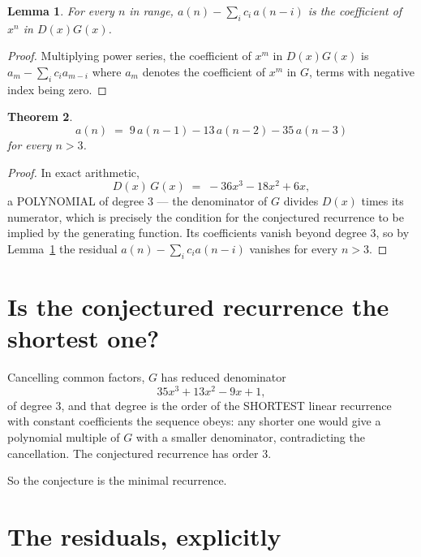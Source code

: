 \documentclass[11pt,a4paper]{article}
\theoremstyle{plain}
\newtheorem{theorem}{Theorem}
\newtheorem{lemma}[theorem]{Lemma}
\theoremstyle{definition}
\begin{document}
\begin{lemma}\label{lem:key}
For every $n$ in range, $a(n)-\sum_i c_i\,a(n-i)$ is the coefficient of $x^{n}$ in
$D(x)G(x)$.
\end{lemma}

\begin{proof}
Multiplying power series, the coefficient of $x^{m}$ in $D(x)G(x)$ is
$a_m-\sum_i c_i a_{m-i}$ where $a_m$ denotes the coefficient of $x^{m}$ in $G$, terms with
negative index being zero.
\end{proof}

\begin{theorem}
\[
a(n)\;=\;9\,a(n-1) - 13\,a(n-2) - 35\,a(n-3)
\]
for every $n>3$.
\end{theorem}

\begin{proof}
In exact arithmetic,
\[
D(x)\,G(x)\;=\;- 36 x^{3} - 18 x^{2} + 6 x,
\]
a POLYNOMIAL of degree $3$ --- the denominator of $G$ divides $D(x)$ times its numerator,
which is precisely the condition for the conjectured recurrence to be implied by the
generating function. Its coefficients vanish beyond degree $3$, so by
Lemma~\ref{lem:key} the residual $a(n)-\sum_ic_ia(n-i)$ vanishes for every
$n>3$.
\end{proof}

\section{Is the conjectured recurrence the shortest one?}

Cancelling common factors, $G$ has reduced denominator
\[
35 x^{3} + 13 x^{2} - 9 x + 1,
\]
of degree $3$, and that degree is the order of the SHORTEST linear recurrence with
constant coefficients the sequence obeys: any shorter one would give a polynomial multiple of
$G$ with a smaller denominator, contradicting the cancellation. The conjectured recurrence has
order $3$.

So the conjecture is the minimal recurrence.

\section{The residuals, explicitly}
\end{document}
